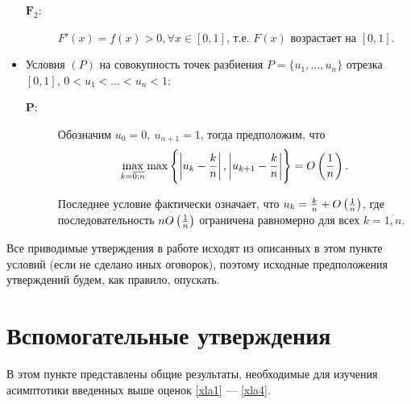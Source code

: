 \documentclass[a4paper,14pt,russian]{article}
\begin{document}
\begin{itemize}
\begin{description}
\item[$\mathbf F_2:$]
$F'(x) = f(x)>0, \forall x \in [0,1]$, т.е. $F(x)$ возрастает на $[0,1]$.

\end{description}

\item
Условия $(P)$ на совокупность точек разбиения $P = \{u_1,\ldots,u_n\}$ отрезка $[0,1]$, $0 < u_1 < \ldots < u_n < 1$:
\begin{description}

\item[$\mathbf P:$]
Обозначим $u_0 = 0,~ u_{n+1}=1$, тогда предположим, что
$$\max_{k=\overline{0;n}}\max\left\{\left|u_k-\frac{k}{n}\right|,\left|u_{k+1}-\frac{k}{n}\right|\right\}= O\left(\frac1n\right).$$

Последнее условие фактически означает, что $u_k = \frac{k}{n} + O\left(\frac1n\right)$, где последовательность $n O\left(\frac1n\right)$ ограничена равномерно для всех $k = \overline{1,n}$.
\end{description}

\end{itemize}


Все приводимые утверждения в работе исходят из описанных в этом пункте условий (если не сделано иных оговорок), поэтому исходные предположения утверждений будем, как правило, опускать.
\newpage

\section{Вспомогательные утверждения}
В этом пункте представлены общие результаты, необходимые для изучения асимптотики введенных выше оценок \eqref{xla1} --- \eqref{xla4}.
\end{document}

